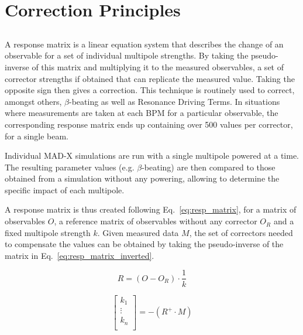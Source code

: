 \section{Correction Principles}


\subsection{}

A response matrix is a linear equation system that describes the change of an observable for a set
of individual multipole strengths. By taking the pseudo-inverse of this matrix and multiplying it to
the measured observables, a set of corrector strengths if obtained that can replicate the measured
value. Taking the opposite sign then gives a correction.  This technique is routinely used to
correct, amongst others, $\beta$-beating as well as Resonance Driving Terms. In situations where
measurements are taken at each BPM for a particular observable, the corresponding response matrix
ends up containing over 500 values per corrector, for a single beam.

Individual MAD-X simulations are run with a single multipole powered at a time. The resulting
parameter values (e.g. $\beta$-beating) are then compared to those obtained from a simulation without
any powering, allowing to determine the specific impact of each multipole.

A response matrix is thus created following Eq.~\eqref{eq:resp_matrix}, for a matrix of observables
$O$, a reference matrix of observables without any corrector $O_R$ and a fixed multipole strength
$k$. Given measured data $M$, the set of correctors needed to compensate the values can be obtained
by taking the pseudo-inverse of the matrix in Eq.~\eqref{eq:resp_matrix_inverted}.

\begin{equation}
  R = \left(O - O_R \right) \cdot \frac{1}{k}
  \label{eq:resp_matrix}
\end{equation}

\begin{equation}
  \begin{bmatrix}
    k_1 \\
    \vdots \\
    k_n \\
  \end{bmatrix}
  = -(R^{+} \cdot M)
  \label{eq:resp_matrix_inverted}
\end{equation}
 
